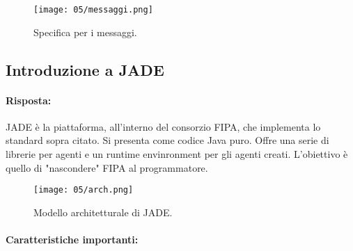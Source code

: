 
\begin{figure}[!h]
    \centering
    \texttt{[image: 05/messaggi.png]}
  \caption{Specifica per i messaggi.}
\end{figure}

\subsection{Introduzione a JADE}


\paragraph{Risposta:} JADE è la piattaforma, all'interno del consorzio FIPA, che implementa lo standard sopra citato. Si presenta come codice Java puro. Offre una serie di librerie per agenti e un runtime envinronment per gli agenti creati. L'obiettivo è quello di "nascondere" FIPA al programmatore. 

\begin{figure}[!h]
    \centering
    \texttt{[image: 05/arch.png]}
  \caption{Modello architetturale di JADE.}
\end{figure}

\paragraph{Caratteristiche importanti:}

